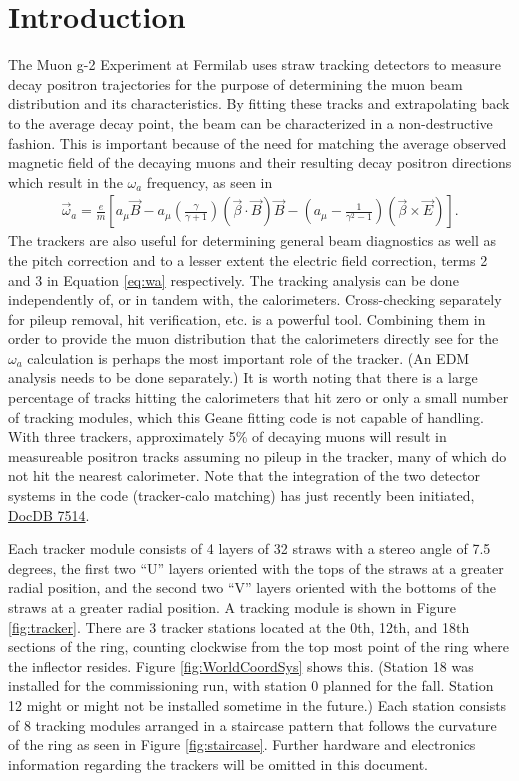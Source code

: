 \section{Introduction}

  The Muon g-2 Experiment at Fermilab uses straw tracking detectors to measure decay positron trajectories for the purpose of determining the muon beam distribution and its characteristics. By fitting these tracks and extrapolating back to the average decay point, the beam can be characterized in a non-destructive fashion. This is important because of the need for matching the average observed magnetic field of the decaying muons and their resulting decay positron directions which result in the $\omega_{a}$ frequency, as seen in
        \begin{align} \label{eq:wa}
            \vec{\omega}_{a} = \frac{e}{m} [a_{\mu}\vec{B} - a_{\mu} (\frac{\gamma}{\gamma+1})(\vec{\beta} \cdot \vec{B})\vec{B} - (a_{\mu} - \frac{1}{\gamma^{2}-1})(\vec{\beta} \times \vec{E}) ].
        \end{align}
  The trackers are also useful for determining general beam diagnostics as well as the pitch correction and to a lesser extent the electric field correction, terms 2 and 3 in Equation \ref{eq:wa} respectively. The tracking analysis can be done independently of, or in tandem with, the calorimeters. Cross-checking separately for pileup removal, hit verification, etc. is a powerful tool. Combining them in order to provide the muon distribution that the calorimeters directly see for the $\omega_{a}$ calculation is perhaps the most important role of the tracker. (An EDM analysis needs to be done separately.) It is worth noting that there is a large percentage of tracks hitting the calorimeters that hit zero or only a small number of tracking modules, which this Geane fitting code is not capable of handling. With three trackers, approximately 5\% of decaying muons will result in measureable positron tracks assuming no pileup in the tracker, many of which do not hit the nearest calorimeter. Note that the integration of the two detector systems in the code (tracker-calo matching) has just recently been initiated, \href{https://gm2-docdb.fnal.gov/cgi-bin/private/ShowDocument?docid=7514}{DocDB 7514}.

  Each tracker module consists of 4 layers of 32 straws with a stereo angle of 7.5 degrees, the first two ``U'' layers oriented with the tops of the straws at a greater radial position, and the second two ``V'' layers oriented with the bottoms of the straws at a greater radial position. A tracking module is shown in Figure \ref{fig:tracker}. There are 3 tracker stations located at the 0th, 12th, and 18th sections of the ring, counting clockwise from the top most point of the ring where the inflector resides. Figure \ref{fig:WorldCoordSys} shows this. (Station 18 was installed for the commissioning run, with station 0 planned for the fall. Station 12 might or might not be installed sometime in the future.) Each station consists of 8 tracking modules arranged in a staircase pattern that follows the curvature of the ring as seen in Figure \ref{fig:staircase}. Further hardware and electronics information regarding the trackers will be omitted in this document.

